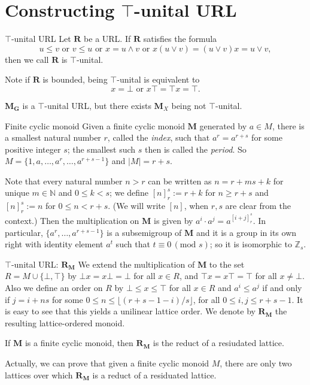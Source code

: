 \documentclass[professionalfont, 10pt]{beamer} %
\theoremstyle{plain}
\theoremstyle{definition}
\newcommand{\m}[1]{{\mathbf {#1} }}
\newcommand{\jn}{\vee}
\newcommand{\mt}{\wedge}
\begin{document}
\section{Constructing $\top$-unital URL}

\begin{frame}{$\top$-unital URL}
    Let $\m R$ be a URL.
    If $\m R$ satisfies the formula
    \[
        u \leq v \text{ or } v \leq u \text{ or } x = u \mt v \text{ or } x(u \jn v) = (u \jn v)x = u \jn v,
    \]
    then we call $\m R$ is $\top$-unital.

    Note if $\m R$ is bounded, being $\top$-unital is equivalent to
    \[
        x = \bot \text{ or } x \top = \top x = \top.
    \]

    $\m M_{\m G}$ is a $\top$-unital URL, but there exists $\m M_X$ being not $\top$-unital.
\end{frame}

\begin{frame}{Finite cyclic monoid}
    Given a finite cyclic monoid $\mathbf{M}$ generated by $a \in M$, there is a smallest natural number $r$, called the \emph{index}, such that $a^r = a^{r+s}$ for some  positive integer $s$; the smallest such $s$ then is called the \emph{period}.
    So $M = \{1, a, \dots, a^r, \dots, a^{r+s-1}\}$ and $|M|=r+s$.\pause
    
    Note that every natural number $n > r$ can be written as $n=r+ms+k$ for unique $m \in \mathbb{N}$ and $0 \leq k <s$; we define $[n]_r^s:= r+k$ for $n \geq r+s$ and $[n]_r^s:= n$ for $0 \leq n < r+s$.
    (We will write $[n]$, when $r,s$ are clear from the context.)
    Then the multiplication on $\m M$ is given by $a^i \cdot a^j =a^{[i+j]_r^s}$.
    In particular, $\{a^r, \dots, a^{r+s-1}\}$ is a subsemigroup of $\m M$ and it is a  group in its own right with identity element $a^t$ such that $t \equiv 0 \, (\text{mod } s)$; so it is isomorphic to $\mathbb{Z}_s$.
\end{frame}

\begin{frame}{$\top$-unital URL: $\m R_{\m M}$}
    We extend the multiplication of $\m M$ to the set $R = M \cup \{\bot, \top\}$ by $\bot x = x \bot = \bot$ for all $x \in R$, and $\top x = x \top = \top$ for all $x \not = \bot$.
    Also we define an order on $R$ by $\bot \leq x \leq \top$ for all $x \in R$ and
    $a^i \leq a^j$ if and only if $j = i+ns$ for some $0 \leq n \leq \lfloor (r+s-1-i)/s \rfloor$, for all $0 \leq i, j \leq r+s-1$.
    It is easy to see that this yields a unilinear lattice order.
    We denote by $\m R_{\m M}$ the resulting lattice-ordered monoid.

    \begin{block}{}
        If $\m M$ is a finite cyclic monoid, then $\mathbf{R}_{\m M}$ is the reduct of a resiudated lattice.
    \end{block}
    \pause

    Actually, we can prove that given a finite cyclic monoid $M$, there are only two lattices over which $\m R_{\m M}$ is a reduct of a residuated lattice.
\end{frame}
\end{document}
